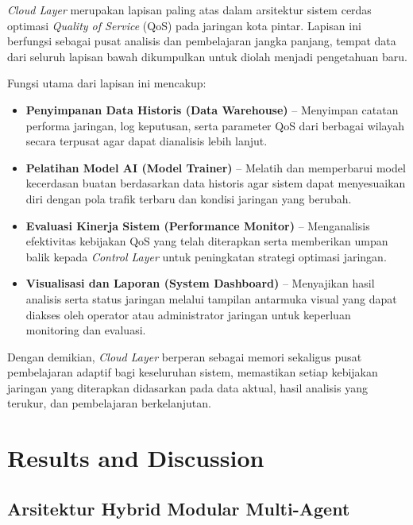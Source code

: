 \documentclass[a4paper,conference]{IEEEtran}
\begin{document}
\textit{Cloud Layer} merupakan lapisan paling atas dalam arsitektur sistem cerdas optimasi \textit{Quality of Service} (QoS) pada jaringan kota pintar. 
Lapisan ini berfungsi sebagai pusat analisis dan pembelajaran jangka panjang, tempat data dari seluruh lapisan bawah dikumpulkan untuk diolah menjadi pengetahuan baru.

Fungsi utama dari lapisan ini mencakup:

\begin{itemize}
    \item \textbf{Penyimpanan Data Historis (Data Warehouse)} -- 
    Menyimpan catatan performa jaringan, log keputusan, serta parameter QoS dari berbagai wilayah secara terpusat agar dapat dianalisis lebih lanjut.

    \item \textbf{Pelatihan Model AI (Model Trainer)} -- 
    Melatih dan memperbarui model kecerdasan buatan berdasarkan data historis agar sistem dapat menyesuaikan diri dengan pola trafik terbaru dan kondisi jaringan yang berubah.

    \item \textbf{Evaluasi Kinerja Sistem (Performance Monitor)} -- 
    Menganalisis efektivitas kebijakan QoS yang telah diterapkan serta memberikan umpan balik kepada \textit{Control Layer} untuk peningkatan strategi optimasi jaringan.

    \item \textbf{Visualisasi dan Laporan (System Dashboard)} -- 
    Menyajikan hasil analisis serta status jaringan melalui tampilan antarmuka visual yang dapat diakses oleh operator atau administrator jaringan untuk keperluan monitoring dan evaluasi.
\end{itemize}

Dengan demikian, \textit{Cloud Layer} berperan sebagai memori sekaligus pusat pembelajaran adaptif bagi keseluruhan sistem, 
memastikan setiap kebijakan jaringan yang diterapkan didasarkan pada data aktual, hasil analisis yang terukur, dan pembelajaran berkelanjutan.




\section{Results and Discussion}

\subsection{Arsitektur Hybrid Modular Multi-Agent}
\end{document}
